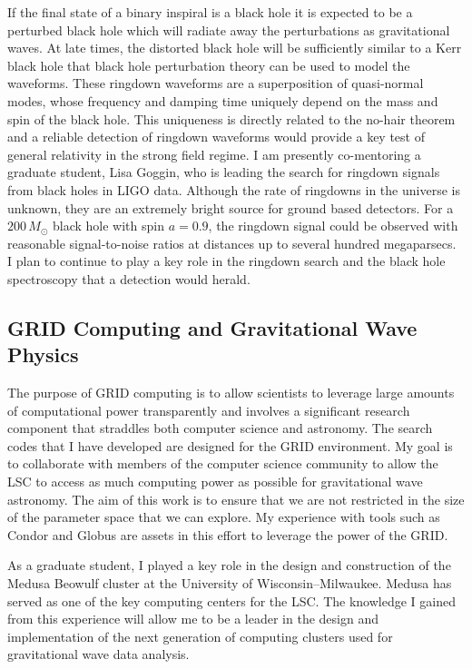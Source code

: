 If the final state of a binary inspiral is a black hole it is expected to be
a perturbed black hole which will radiate away the perturbations as
gravitational waves. At late times, the distorted black hole will be
sufficiently similar to a Kerr black hole that black hole perturbation theory
can be used to model the waveforms\cite{Teukolsky:1973ha}. These ringdown
waveforms are a superposition of quasi-normal modes, whose frequency and
damping time uniquely depend on the mass and spin of the black hole. This
uniqueness is directly related to the no-hair theorem and a reliable detection
of ringdown waveforms would provide a key test of general relativity in the
strong field regime\cite{Dreyer:2003bv}. I am presently co-mentoring a
graduate student, Lisa Goggin, who is leading the search for ringdown signals
from black holes in LIGO data. Although the rate of ringdowns in the universe
is unknown, they are an extremely bright source for ground based detectors.
For a $200\,M_\odot$ black hole with spin $a = 0.9$, the ringdown signal could
be observed with reasonable signal-to-noise ratios at distances up to several
hundred megaparsecs. I plan to continue to play a key role in the ringdown
search and the black hole spectroscopy that a detection would herald.

\subsection{GRID Computing and Gravitational Wave Physics}

The purpose of GRID computing is to allow scientists to leverage large amounts
of computational power transparently and involves a significant research
component that straddles both computer science and astronomy. The search codes
that I have developed are designed for the GRID environment.  My goal is to
collaborate with members of the computer science community to allow the LSC to
access as much computing power as possible for gravitational wave astronomy.
The aim of this work is to ensure that we are not restricted in the size of the
parameter space that we can explore. My experience with tools such as Condor
and Globus are assets in this effort to leverage the power of the GRID.

As a graduate student, I played a key role in the design and construction of
the Medusa Beowulf cluster at the University of Wisconsin--Milwaukee. Medusa
has served as one of the key computing centers for the LSC. The knowledge I
gained from this experience will allow me to be a leader in the design and
implementation of the next generation of computing clusters used for
gravitational wave data analysis.


